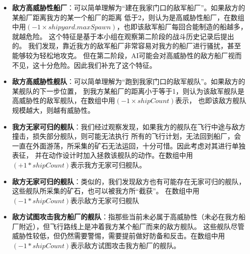 \documentclass{article}
\begin{document}
\begin{itemize}
	\item  \textbf{敌方高威胁性船厂}：可以简单理解为“建在我家门口的敌军船厂”。如果敌方的某船厂距离我方的某一个船厂的距离
			低于2，则认为是高威胁性船厂，在数组中用$(-1\times shipyard.maxSpawn)$，也即该敌军船厂每回合能制造的船越多，就越危险。
			这个特征是基于本小组在观察第二阶段的战斗历史记录后提出的。
			我们发现，靠近我方的敌军船厂非常容易对我方的船厂进行骚扰，甚至能够较为轻松地攻克。
			但在第二阶段，AI可能会对高威胁性的敌方船厂视而不见，这十分危险。因此我们补充了这个特征。
	\item  \textbf{敌方高威胁性舰队}：可以简单理解为“跑到我家门口的敌军舰队”。如果敌方的某舰队的下一步位置，
			到我方某船厂的距离小于等于1，则认为该敌军舰队是高威胁性的敌军舰队，在数组中用$(-1\times shipCount)$表示，
			也即该敌方舰队规模越大，则越有威胁性。
	\item  \textbf{我方无家可归的舰队}：我们经过观察发现，如果我方的舰队在飞行中途与敌方撞击，损失部分舰队，则可能无法执行
			所有的飞行计划，无法回到船厂，会一直在外面游荡，所采集的矿石无法运回，十分可惜。因此考虑对其进行单独表征，
			并在动作设计时加入拯救该舰队的动作。在数组中用$(+1*shipCount)$表示我方无家可归舰队。
	\item  \textbf{敌方无家可归的舰队}：类似的，我们发现敌方也有可能存在无家可归的舰队，这些舰队所采集的矿石，也可以被我方所“截获”。
			在数组中用$(-1*shipCount)$表示敌方无家可归舰队
	\item  \textbf{敌方试图攻击我方船厂的舰队}：指那些当前未必属于高威胁性（未必在我方船厂附近），但飞行路线上是冲着我方某个船厂而来的敌方舰队。
			这些舰队尽管威胁性较低，但仍然需要警惕，需要提前做好防备和反击。在数组中用$(-1*shipCount)$表示敌方试图攻击我方船厂的舰队。
\end{itemize}
\end{document}

